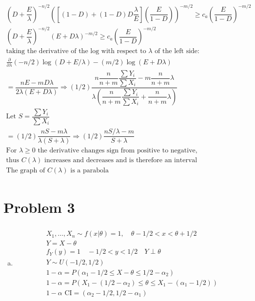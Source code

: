 \documentclass{article}
\newcommand{\pderiv}[2]{\frac{\partial #1}{\partial #2}}
\newcommand{\lm}{\lambda}
\newcommand{\ta}{\theta}
\newcommand{\samp}{X_1,\dots,X_n \sim}
\newcommand{\al}{\alpha}
\begin{document}
\begin{flushleft}
\begin{enumerate}[(a)]
\begin{multline*}
\left(D+\dfrac{E}{\lm}\right)^{-n/2}\left([(1-D)+(1-D)D\dfrac{\lm}{E}]\left(\dfrac{E}{1-D}\right)\right)^{-m/2}\geq c_a\left(\dfrac{E}{1-D}\right)^{-m/2}\\
\left(D+\dfrac{E}{\lm}\right)^{-n/2}\left(E+D\lm\right)^{-m/2}\geq c_a\left(\dfrac{E}{1-D}\right)^{-m/2}\\
\text{taking the derivative of the log with respect to } \lm \text{ of the left side:}\\
\pderiv{}{\lm}(-n/2)\log(D+E/\lm)-(m/2)\log(E+D\lm)\\
=\dfrac{nE-mD\lm}{2\lm(E+D\lm)}\Rightarrow(1/2)\dfrac{n\dfrac{n}{n+m}\dfrac{\sum Y_i}{\sum X_i}-m\dfrac{n}{n+m}\lm}{\lm(\dfrac{n}{n+m}\dfrac{\sum Y_i}{\sum X_i}+\dfrac{n}{n+m}\lm)}\\
\text{Let } S=\dfrac{\sum Y_i}{\sum X_i}\\
=(1/2)\dfrac{nS-m\lm}{\lm(S+\lm)}\Rightarrow
(1/2)\dfrac{nS/\lm-m}{S+\lm}\\
\text{For } \lm\geq 0 \text{ the derivative} \text{ changes sign from positive to negative,}\\
\text{thus } C(\lm) \text{ increases and decreases and is therefore an interval}\\
\text{The graph of } C(\lm) \text{ is a parabola}\\
\end{multline*}
	
\end{enumerate}

	\section*{Problem 3}
	
\begin{enumerate}[(a)]
	\item 
\begin{multline*}\\
\samp f(x|\ta)=1, \quad \ta-1/2<x<\ta+1/2\\
Y=X-\ta \\
f_Y(y)=1 \quad -1/2<y<1/2 \quad Y\perp \ta\\
Y\sim U(-1/2,1/2)\\
1-\al=P(\al_1-1/2\leq X-\ta\leq 1/2-\al_2)\\
1-\al=P(X_1-(1/2-\al_2)\leq\ta\leq X_1-(\al_1-1/2))\\
1-\al \text{ CI}=(\al_2-1/2,1/2-\al_1)\\
\end{multline*}
	

\end{enumerate}
\end{flushleft}
\end{document}

